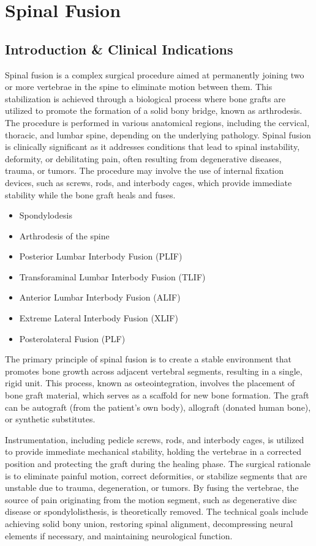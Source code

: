 \chapter{Spinal Fusion}

\section*{Introduction \& Clinical Indications}
Spinal fusion is a complex surgical procedure aimed at permanently joining two or more vertebrae in the spine to eliminate motion between them. This stabilization is achieved through a biological process where bone grafts are utilized to promote the formation of a solid bony bridge, known as arthrodesis. The procedure is performed in various anatomical regions, including the cervical, thoracic, and lumbar spine, depending on the underlying pathology. Spinal fusion is clinically significant as it addresses conditions that lead to spinal instability, deformity, or debilitating pain, often resulting from degenerative diseases, trauma, or tumors. The procedure may involve the use of internal fixation devices, such as screws, rods, and interbody cages, which provide immediate stability while the bone graft heals and fuses.

\begin{itemize}
  \item Spondylodesis
  \item Arthrodesis of the spine
  \item Posterior Lumbar Interbody Fusion (PLIF)
  \item Transforaminal Lumbar Interbody Fusion (TLIF)
  \item Anterior Lumbar Interbody Fusion (ALIF)
  \item Extreme Lateral Interbody Fusion (XLIF)
  \item Posterolateral Fusion (PLF)
\end{itemize}

The primary principle of spinal fusion is to create a stable environment that promotes bone growth across adjacent vertebral segments, resulting in a single, rigid unit. This process, known as osteointegration, involves the placement of bone graft material, which serves as a scaffold for new bone formation. The graft can be autograft (from the patient's own body), allograft (donated human bone), or synthetic substitutes. 

Instrumentation, including pedicle screws, rods, and interbody cages, is utilized to provide immediate mechanical stability, holding the vertebrae in a corrected position and protecting the graft during the healing phase. The surgical rationale is to eliminate painful motion, correct deformities, or stabilize segments that are unstable due to trauma, degeneration, or tumors. By fusing the vertebrae, the source of pain originating from the motion segment, such as degenerative disc disease or spondylolisthesis, is theoretically removed. The technical goals include achieving solid bony union, restoring spinal alignment, decompressing neural elements if necessary, and maintaining neurological function.

